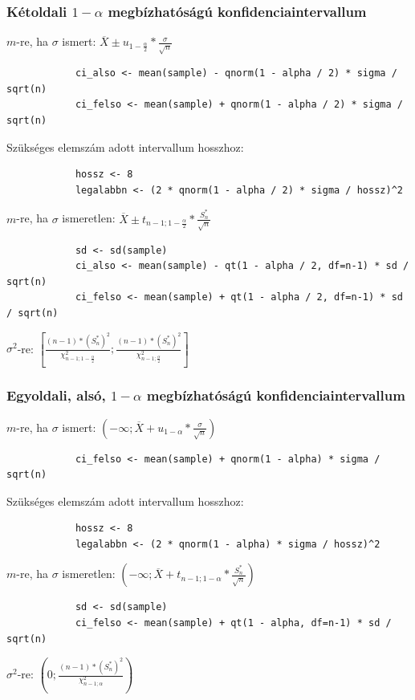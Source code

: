 \documentclass[12pt,a4paper]{article}
\begin{document}
\subsubsection{Kétoldali $1 - \alpha$ megbízhatóságú konfidenciaintervallum}

\begin{outline}
	\1 $m$-re, ha $\sigma$ ismert:
	$\overline{X} \pm u_{1-\frac{\alpha}{2}} * \frac{\sigma}{\sqrt{n}}$
		\2 \begin{verbatim}
			ci_also <- mean(sample) - qnorm(1 - alpha / 2) * sigma / sqrt(n)
			ci_felso <- mean(sample) + qnorm(1 - alpha / 2) * sigma / sqrt(n)\end{verbatim}
		\2 Szükséges elemszám adott intervallum hosszhoz: \begin{verbatim}
			hossz <- 8
			legalabbn <- (2 * qnorm(1 - alpha / 2) * sigma / hossz)^2
			\end{verbatim}
	\1 $m$-re, ha $\sigma$ ismeretlen:
	$\overline{X} \pm t_{n-1;1-\frac{\alpha}{2}} * \frac{S^*_n}{\sqrt{n}}$
		\2 \begin{verbatim}
			sd <- sd(sample)
			ci_also <- mean(sample) - qt(1 - alpha / 2, df=n-1) * sd / sqrt(n)
			ci_felso <- mean(sample) + qt(1 - alpha / 2, df=n-1) * sd / sqrt(n)\end{verbatim}
	\1 $\sigma^2$-re: $[ \frac{(n-1) * (S^*_n)^2}{\chi^2_{n-1;1-\frac{\alpha}{2}}}
	; \frac{(n-1) * (S^*_n)^2}{\chi^2_{n-1;\frac{\alpha}{2}}} ]$
\end{outline}

\pagebreak

\subsubsection{Egyoldali, alsó, $1 - \alpha$ megbízhatóságú konfidenciaintervallum}

\begin{outline}
	\1 $m$-re, ha $\sigma$ ismert:
	$(-\infty; \overline{X} + u_{1-\alpha} * \frac{\sigma}{\sqrt{n}})$
		\2 \begin{verbatim}
			ci_felso <- mean(sample) + qnorm(1 - alpha) * sigma / sqrt(n)\end{verbatim}
		\2 Szükséges elemszám adott intervallum hosszhoz: \begin{verbatim}
			hossz <- 8
			legalabbn <- (2 * qnorm(1 - alpha) * sigma / hossz)^2
			\end{verbatim}
	\1 $m$-re, ha $\sigma$ ismeretlen:
	$(-\infty; \overline{X} + t_{n-1;1-\alpha} * \frac{S^*_n}{\sqrt{n}})$
		\2 \begin{verbatim}
			sd <- sd(sample)
			ci_felso <- mean(sample) + qt(1 - alpha, df=n-1) * sd / sqrt(n)\end{verbatim}
	\1 $\sigma^2$-re: $(0; \frac{(n-1) * (S^*_n)^2}{\chi^2_{n-1;\alpha}})$
\end{outline}
\end{document}
